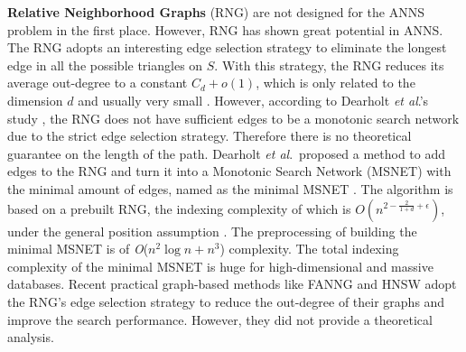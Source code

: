 \documentclass{vldb}
\def\etal{\emph{et al}.}
\begin{document}
\textbf{Relative Neighborhood Graphs} (RNG) \cite{toussaint1980relative} are not designed for the ANNS problem in the first place. However, RNG has shown great potential in ANNS. The RNG adopts an interesting edge selection strategy to eliminate the longest edge in all the possible triangles on $S$. With this strategy, the RNG reduces its average out-degree to a constant $C_d+o(1)$, which is only related to the dimension $d$ and usually very small \cite{jaromczyk1992relative}. However, according to Dearholt \etal's study \cite{dearholt1988monotonic}, the RNG does not have sufficient edges to be a monotonic search network due to the strict edge selection strategy. Therefore there is no theoretical guarantee on the length of the path. Dearholt \etal ~proposed a method to add edges to the RNG and turn it into a Monotonic Search Network (MSNET) with the minimal amount of edges, named as the minimal MSNET \cite{dearholt1988monotonic}. The algorithm is based on a prebuilt RNG, the indexing complexity of which is $O(n^{2-\frac{2}{1+d} +\epsilon})$, under the general position assumption \cite{jaromczyk1992relative}. The preprocessing of building the minimal MSNET is of \textit{O}($n^2\log n + n^3$) complexity. The total indexing complexity of the minimal MSNET is huge for high-dimensional and massive databases. Recent practical graph-based methods like FANNG \cite{Ben2016Fanng} and HNSW \cite{MalkovYHNSW16} adopt the RNG's edge selection strategy to reduce the out-degree of their graphs and improve the search performance. However, they did not provide a theoretical analysis.
\end{document}
